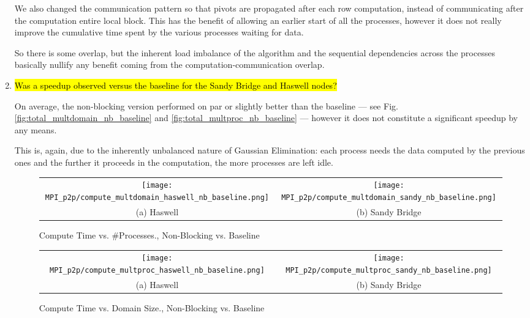 \begin{enumerate}
	We also changed the communication pattern so that pivots are propagated after each row computation, instead of communicating after the computation entire local block. This has the benefit of allowing an earlier start of all the processes, however it does not really improve the cumulative time spent by the various processes waiting for data.

	So there is some overlap, but the inherent load imbalance of the algorithm and the sequential dependencies across the processes basically nullify any benefit coming from the computation-communication overlap.

	\item \hl{Was a speedup observed versus the baseline for the Sandy Bridge and Haswell nodes?}

	On average, the non-blocking version performed on par or slightly better than the baseline --- see Fig.\ref{fig:total_multdomain_nb_baseline} and \ref{fig:total_multproc_nb_baseline} --- however it does not constitute a significant speedup by any means.

	This is, again, due to the inherently unbalanced nature of Gaussian Elimination: each process needs the data computed by the previous ones and the further it proceeds in the computation, the more processes are left idle.
	
	
	    	\begin{figure}[h] %
		\hspace*{-0.25\linewidth}\begin{tabular}{cc}
			\texttt{[image: MPI\_p2p/compute\_multdomain\_haswell\_nb\_baseline.png]} & \texttt{[image: MPI\_p2p/compute\_multdomain\_sandy\_nb\_baseline.png]} \\
			(a) Haswell &  (b) Sandy Bridge\\[6pt]
		\end{tabular}
		\caption{Compute Time vs. \#Processes., Non-Blocking vs. Baseline}
		\label{fig:compute_multdomain_nb_baseline}
	\end{figure}
	
	\begin{figure}[h] %
		\hspace*{-0.25\linewidth}\begin{tabular}{cc}
			\texttt{[image: MPI\_p2p/compute\_multproc\_haswell\_nb\_baseline.png]} & \texttt{[image: MPI\_p2p/compute\_multproc\_sandy\_nb\_baseline.png]} \\
			(a) Haswell &  (b) Sandy Bridge\\[6pt]
		\end{tabular}
		\caption{Compute Time vs. Domain Size., Non-Blocking vs. Baseline}
		\label{fig:compute_multproc_nb_baseline}
	\end{figure}
	

\end{enumerate}
